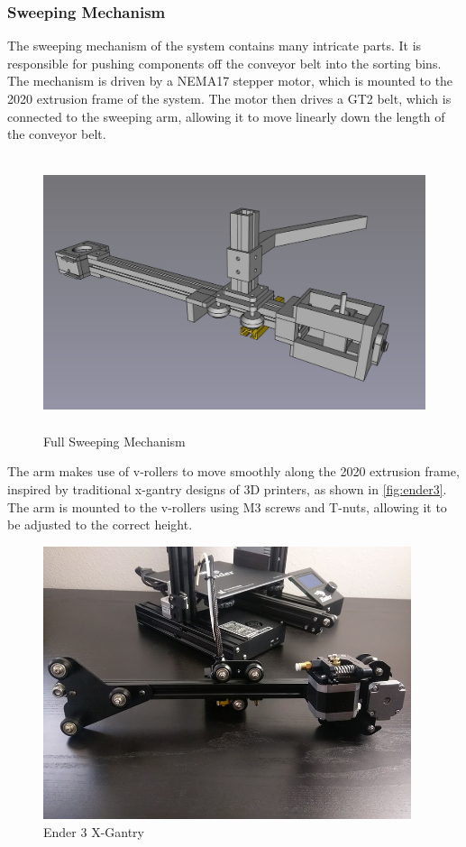 \subsubsection{Sweeping Mechanism}
The sweeping mechanism of the system contains many intricate parts. It is responsible for pushing components off the conveyor belt into the sorting bins. The mechanism is driven by a NEMA17 stepper motor, which is mounted to the 2020 extrusion frame of the system. The motor then drives a GT2 belt, which is connected to the sweeping arm, allowing it to move linearly down the length of the conveyor belt. 
\begin{figure}[H]
    \begin{minipage}[h]{0.95\textwidth}
        \centering
        \includegraphics[height=8cm]{imgs/freecad/fullsweeper.jpg}
        \caption{Full Sweeping Mechanism}
        \label{fig:sweeperfull}
    \end{minipage}
\end{figure}

The arm makes use of v-rollers to move smoothly along the 2020 extrusion frame, inspired by traditional x-gantry designs of 3D printers, as shown in \autoref{fig:ender3}. The arm is mounted to the v-rollers using M3 screws and T-nuts, allowing it to be adjusted to the correct height.

\begin{figure}[H]
    \begin{minipage}[h]{0.95\textwidth}
        \centering
        \includegraphics[height=8cm]{imgs/freecad/ender_3_assembly_x_axis_complete.jpg}
        \caption{Ender 3 X-Gantry \cite{brett_2018}}
        \label{fig:ender3}
    \end{minipage}
\end{figure}

